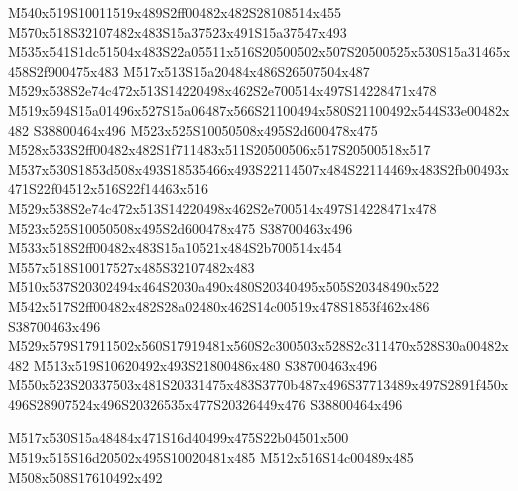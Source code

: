 \documentclass{article}
\begin{document}
\begin{multicols}{2}
M540x519S10011519x489S2ff00482x482S28108514x455 M570x518S32107482x483S15a37523x491S15a37547x493 M535x541S1dc51504x483S22a05511x516S20500502x507S20500525x530S15a31465x458S2f900475x483 M517x513S15a20484x486S26507504x487 M529x538S2e74c472x513S14220498x462S2e700514x497S14228471x478 M519x594S15a01496x527S15a06487x566S21100494x580S21100492x544S33e00482x482 S38800464x496 M523x525S10050508x495S2d600478x475 M528x533S2ff00482x482S1f711483x511S20500506x517S20500518x517 M537x530S1853d508x493S18535466x493S22114507x484S22114469x483S2fb00493x471S22f04512x516S22f14463x516 M529x538S2e74c472x513S14220498x462S2e700514x497S14228471x478 M523x525S10050508x495S2d600478x475 S38700463x496 M533x518S2ff00482x483S15a10521x484S2b700514x454 M557x518S10017527x485S32107482x483 M510x537S20302494x464S2030a490x480S20340495x505S20348490x522 M542x517S2ff00482x482S28a02480x462S14c00519x478S1853f462x486 S38700463x496 M529x579S17911502x560S17919481x560S2c300503x528S2c311470x528S30a00482x482 M513x519S10620492x493S21800486x480 S38700463x496 M550x523S20337503x481S20331475x483S3770b487x496S37713489x497S2891f450x496S28907524x496S20326535x477S20326449x476 S38800464x496






\begin{center}
M517x530S15a48484x471S16d40499x475S22b04501x500 M519x515S16d20502x495S10020481x485 M512x516S14c00489x485 M508x508S17610492x492 
\end{center}








\end{multicols}
\end{document}
